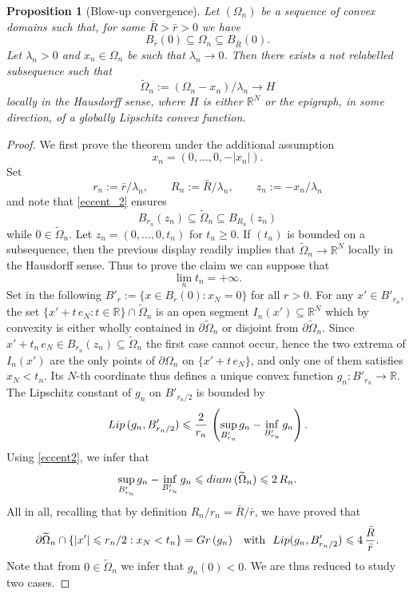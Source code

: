\documentclass[12pt]{amsart}
\numberwithin{equation}{section}
\theoremstyle{plain}
\theoremstyle{plain}
\newtheorem{proposition}[theorem]{Proposition}
\theoremstyle{plain}
\theoremstyle{definition}
\newcommand{\R}{{\mathbb R}}
\newcommand{\beq}{\begin{equation}}
\newcommand{\eeq}{\end{equation}}
\renewcommand{\le}{\leqslant}
\renewcommand{\ge}{\geqslant}
\begin{document}
\begin{proposition}[Blow-up convergence]
\label{prop_blowup_domain}
Let $(\Omega_n)$ be a sequence of convex domains such that, for some $\bar{R}>\bar{r}>0$ we have
\beq
\label{eccent_2}
B_{\bar r}(0)\subseteq \Omega_n\subseteq B_{\bar R}(0).
\eeq
Let $\lambda_n>0$ and $x_n \in \Omega_n$ be such that $\lambda_n\to 0$.
Then there exists a not relabelled subsequence such that 
$$\widetilde{\Omega}_n:= \left(\Omega_n-x_n\right)/\lambda_n\to H$$
locally in the Hausdorff sense, where $H$ is either $\R^N$ or the epigraph, in some direction, of a globally Lipschitz convex function.
\end{proposition}

\begin{proof}
We first prove the theorem under the additional assumption
\beq
\label{rotaxis_2}
x_n=(0, \dots, 0, -|x_n|).
\eeq
Set 
 \[
 r_n:=\bar r/ \lambda_n, \qquad R_n:=\bar R/ \lambda_n, \qquad z_n:=-x_n/\lambda_n
 \]
and note that \eqref{eccent_2} ensures 
 \beq
 \label{eccent2}
 B_{r_n}(z_n)\subseteq \widetilde{\Omega}_n\subseteq B_{R_n}(z_n)
 \eeq
 while $0\in \widetilde{\Omega}_n$. Let $z_n=(0, \dots, 0, t_n)$ for $t_n\ge 0 $. If $(t_n)$ is bounded on a subsequence, then the previous display readily implies that $\widetilde{\Omega}_n\to \R^N$ locally in the Hausdorff sense. 
Thus to prove the claim we can suppose that 
 \beq
 \label{tn}
 \lim_n t_n=+\infty.
 \eeq 
 Set in the following $B'_r:=\{x\in B_r(0): x_N=0\}$ for all $r>0$.
For any $x'\in B'_{r_n}$, the set $\{x'+t\, e_N: t\in \R\}\cap \widetilde{\Omega}_n$ is an open segment $I_n(x')\subseteq\R^N$ which by convexity is either wholly contained in $\partial\widetilde{\Omega}_n$ or disjoint from $\partial\widetilde{\Omega}_n$. 
Since $x' + t_n\, e_N\in B_{r_n}(z_n)\subseteq \widetilde{\Omega}_n$ the first case cannot occur, hence the two extrema of $I_n(x')$ are the only points of $\partial\Omega_n$ on $\{x'+t\, e_N\}$, and only one of them satisfies $x_N< t_n$. Its $N$-th coordinate thus defines a unique convex function $g_n: B'_{r_n}\to \R$. 
 The Lipschitz constant of $g_n$ on $B'_{r_n/2}$ is bounded by 
 \[
 {\rm Lip}\, (g_n, B'_{r_n/2})\le \frac{2}{r_n}\, \left(\sup_{B'_{r_n}}g_n-\inf_{B'_{r_n}} g_n\right).
 \]
 Using \eqref{eccent2}, we infer that 
 \[
 \sup_{B'_{r_n}}g_n-\inf_{B'_{r_n} } g_n\le {\rm diam}\, (\widetilde{\Omega}_n)\le 2\, R_n.
 \]
All in all, recalling that by definition $R_n/r_n=\bar R/ \bar r$, we have proved that 
\[
 \partial\widetilde{\Omega}_n\cap \{ |x'|\le r_n/2: x_N< t_n\} = {\rm Gr}\, (g_n)\quad \text{with }\ {\rm Lip}(g_n, B'_{r_n/2})\le 4\, \frac{\bar{R}}{\bar r}.
 \]
Note that from $0\in \widetilde{\Omega}_n$ we infer that $g_n(0)< 0$.
 We are thus reduced to study two cases.


\end{proof}
\end{document}
